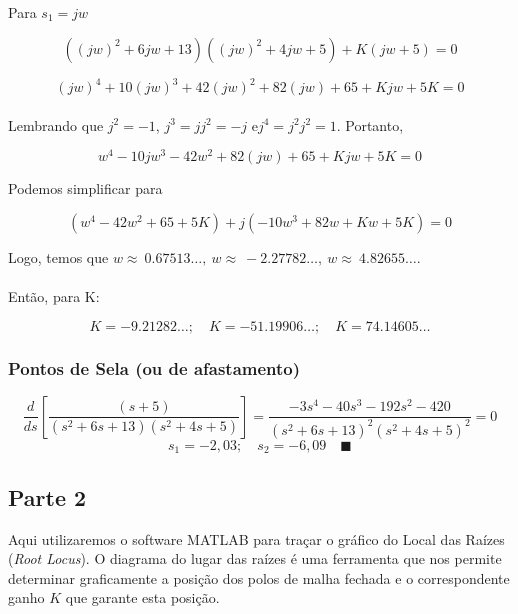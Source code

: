 \documentclass[a4paper, 12pt]{article}
\begin{document}
Para $s_{1}=jw$ 

\begin{equation}
   ((jw)^2+6jw+13)((jw)^2+4jw+5)+K(jw+5) = 0
\end{equation}

\begin{equation}
    (jw)^4+10(jw)^3+42(jw)^2+82(jw)+65+Kjw+5K = 0
\end{equation}\\

Lembrando que $j^2 = -1$, \quad $j^3 = jj^2 = -j$ \quad e\quad $j^4 = j^2j^2=1$. Portanto,


\begin{equation}
    w^4-10jw^3-42w^2+82(jw)+65+Kjw+5K = 0
\end{equation}

Podemos simplificar para

\begin{equation}
    (w^4-42w^2+65+5K)+j(-10w^3+82w+Kw+5K) = 0
\end{equation}

Logo, temos que \quad $w\approx \:0.67513\dots ,\:w\approx \:-2.27782\dots ,\:w\approx \:4.82655\dots $.\\\\
Então, para K:

\begin{equation} \label{eq:estabk}
K=-9.21282\dots; \quad K=-51.19906\dots; \quad K=74.14605\dots    
\end{equation}




\subsubsection{Pontos de Sela (ou de afastamento)} 
\begin{equation}
    \frac{d}{ds}[\frac{(s+5)}{(s^2+6s+13)(s^2+4s+5)}]=\frac{-3s^4-40s^3-192s^2-420}{(s^2+6s+13)^2(s^2+4s+5)^2}=0
\end{equation}
\begin{equation}
	s_{1}=-2,03 ; \quad s_{2}=-6,09 \quad \blacksquare
\end{equation}



\subsection{Parte 2}
Aqui utilizaremos o software MATLAB para traçar o gráfico do Local das Raízes (\textit{Root Locus}). O diagrama do lugar das raízes é uma ferramenta que nos permite determinar graficamente a posição dos polos de malha fechada e o correspondente ganho $K$ que garante esta posição.
\end{document}
